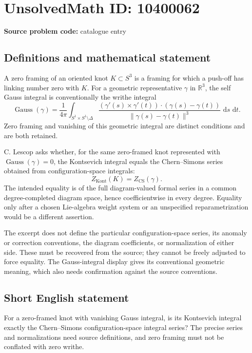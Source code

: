 \documentclass[11pt]{article}
\newcommand{\R}{\mathbb{R}}
\newcommand{\dd}{\,\mathrm{d}}
\begin{document}
\section*{UnsolvedMath ID: 10400062}
\textbf{Source problem code:} catalogue entry
\subsection{Definitions and mathematical statement}
A zero framing of an oriented knot \(K\subset S^3\) is a framing for which a push-off has linking number zero with \(K\). For a geometric representative \(\gamma\) in \(\R^3\), the self Gauss integral is conventionally the writhe integral
\[
 \operatorname{Gauss}(\gamma)=\frac1{4\pi}
 \int_{S^1\times S^1\setminus\Delta}
 \frac{(\gamma'(s)\times\gamma'(t))\cdot(\gamma(s)-\gamma(t))}
 {\|\gamma(s)-\gamma(t)\|^3}\,\dd s\,\dd t.
\]
Zero framing and vanishing of this geometric integral are distinct conditions and are both retained.

C. Lescop asks whether, for the same zero-framed knot represented with \(\operatorname{Gauss}(\gamma)=0\), the Kontsevich integral equals the Chern--Simons series obtained from configuration-space integrals:
\[
 Z_{\mathrm{Kont}}(K)=Z_{\mathrm{CS}}(\gamma).
\]
The intended equality is of the full diagram-valued formal series in a common degree-completed diagram space, hence coefficientwise in every degree. Equality only after a chosen Lie-algebra weight system or an unspecified reparametrization would be a different assertion.

The excerpt does not define the particular configuration-space series, its anomaly or correction conventions, the diagram coefficients, or normalization of either side. These must be recovered from the source; they cannot be freely adjusted to force equality. The Gauss-integral display gives its conventional geometric meaning, which also needs confirmation against the source conventions.
\subsection{Short English statement}
For a zero-framed knot with vanishing Gauss integral, is its Kontsevich integral exactly the Chern--Simons configuration-space integral series? The precise series and normalizations need source definitions, and zero framing must not be conflated with zero writhe.
\end{document}
